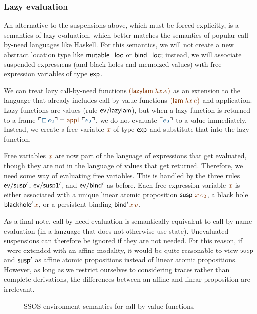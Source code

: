\subsubsection{Lazy evaluation}

An alternative to the suspensions above, which must be forced
explicitly, is a semantics of lazy evaluation, which better matches
the semantics of popular call-by-need languages like Haskell. For this
semantics, we will not create a new abstract location type like ${\sf
  mutable\_loc}$ or ${\sf bind\_loc}$; instead, we will associate 
suspended expressions (and black holes and memoized values) with
free expression variables of type ${\sf exp}$.

We can treat lazy call-by-need functions $\lf{({\sf lazylam}\,\lambda
x.e)}$ as an extension to the language that already includes
call-by-value functions $\lf{({\sf lam}\,\lambda x.e)}$ and
application. Lazy functions are values (rule ${\sf ev/lazylam}$), but
when a lazy function is returned to a frame $\interp{\Box\,e_2} = \lf{{\sf
  app1}\,\interp{e_2}}$, we do not evaluate $\interp{e_2}$ to a value
immediately. Instead, we create a free variable $\lf{x}$ of type ${\sf
  exp}$ and substitute that into the lazy function.

Free variables $\lf{x}$ are now part of the language of expressions that
get evaluated, though they are not in the language of values that get
returned. Therefore, we need some way of evaluating free
variables. This is handled by the three rules ${\sf ev/susp'}$, ${\sf
  ev/susp1'}$, and ${\sf ev/bind'}$ as before. Each free expression
variable $\lf{x}$ is either associated with a unique linear atomic
proposition ${\sf susp'}\,\lf{x}\,\lf{e_2}$, a black hole 
${\sf blackhole'}\,\lf{x}$,
or a persistent binding ${\sf bind'}\,\lf{x}\,\lf{v}$.

As a final note, call-by-need evaluation is semantically equivalent to
call-by-name evaluation (in a language that does not otherwise use
state). Unevaluated suspensions can therefore be ignored if they are
not needed. For this reason, if \sls~were extended with an affine
modality, it would be quite reasonable to view ${\sf susp}$ and ${\sf
  susp'}$ as affine atomic propositions instead of linear atomic
propositions. However, as long as we
restrict ourselves to considering traces rather than complete
derivations, the differences between an affine and linear proposition
are irrelevant.

\begin{figure}
\caption{SSOS environment semantics for call-by-value functions.}
\label{fig:ssos-by-env}
\end{figure}

